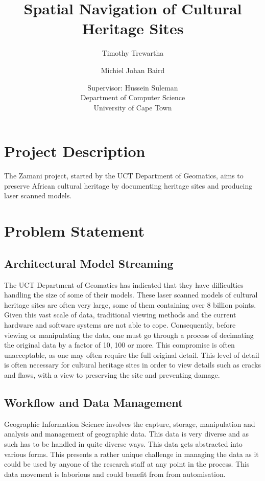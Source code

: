 \documentclass[12pt,a4paper]{article}
\begin{document}
\author{Timothy Trewartha \\
\and
Michiel Johan Baird \\
\and
Supervisor: Hussein Suleman \\
Department of Computer Science \\
University of Cape Town
 }
\title{Spatial Navigation of Cultural Heritage Sites}
\maketitle
{}
\tableofcontents
\newpage

\section{Project Description}
The Zamani project, started by the UCT Department of Geomatics, aims to preserve African cultural heritage by documenting heritage sites and producing laser scanned models.
\section{Problem Statement}
\subsection{Architectural Model Streaming}
The UCT Department of Geomatics has indicated that they have difficulties handling the size of some of their models. These laser scanned models of cultural heritage sites are often very large, some of them containing over 8 billion points. Given this vast scale of data, traditional viewing methods and the current hardware and software systems are not able to cope.  Consequently, before viewing or manipulating the data, one must go through a process of decimating the original data by a factor of 10, 100 or more. This compromise is often unacceptable, as one may often require the full original detail. This level of detail is often necessary for cultural heritage sites in order to view details such as cracks and flaws, with a view to preserving the site and preventing damage.
\subsection{Workflow and Data Management}
Geographic Information Science involves the capture, storage, manipulation and analysis
and management of geographic data. This data is very diverse and as such has to be handled
in quite diverse ways. This data gets abstracted into various forms. This presents a
rather unique challenge in managing the data as it could be used by anyone of the research
staff at any point in the process. This data movement is laborious and could benefit from
from automisation.
\end{document}
